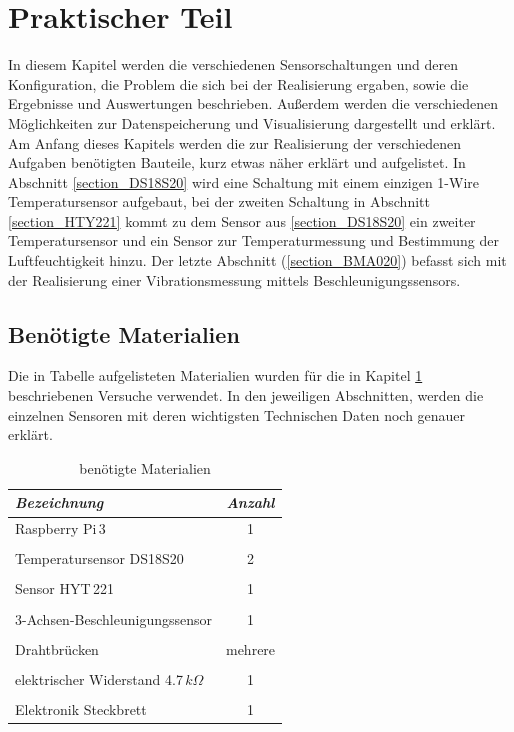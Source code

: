 \chapter{Praktischer Teil}
\label{chapter_Praktischer_Teil}
In diesem Kapitel werden die verschiedenen Sensorschaltungen und deren Konfiguration, die Problem
die sich bei der Realisierung ergaben, sowie die Ergebnisse und Auswertungen beschrieben. Außerdem werden die verschiedenen Möglichkeiten zur Datenspeicherung und Visualisierung dargestellt und erklärt. Am Anfang dieses Kapitels werden die zur Realisierung der verschiedenen Aufgaben benötigten Bauteile, kurz etwas näher erklärt und aufgelistet. In Abschnitt \ref{section_DS18S20} wird eine Schaltung mit einem einzigen 1-Wire Temperatursensor aufgebaut, bei der zweiten Schaltung in Abschnitt \ref{section_HTY221} kommt zu dem Sensor aus \ref{section_DS18S20} ein zweiter Temperatursensor und ein Sensor zur Temperaturmessung und Bestimmung der Luftfeuchtigkeit hinzu. Der letzte Abschnitt (\ref{section_BMA020}) befasst sich mit der Realisierung einer Vibrationsmessung mittels Beschleunigungssensors.

\section{Benötigte Materialien}
\label{section_Benötigte_Materialien}
Die in Tabelle aufgelisteten Materialien wurden für die in Kapitel \ref{chapter_Praktischer_Teil} beschriebenen Versuche verwendet. In den jeweiligen Abschnitten, werden die  einzelnen Sensoren mit deren wichtigsten Technischen Daten noch genauer erklärt. 

\begin{table}[H]
\centering
\begin{tabular}{
lc
}
\toprule
\multicolumn{1}{p{6cm}}{\textit{Bezeichnung}} & \multicolumn{1}{p{3.5cm}}{\centering\textit{Anzahl} } \\\midrule
Raspberry Pi\,3& 1 \\
&\\
Temperatursensor DS18S20 & 2 \\
&\\
Sensor HYT\,221 & 1\\
&\\
3-Achsen-Beschleunigungssensor & 1\\
&\\
Drahtbrücken & mehrere\\
&\\
elektrischer Widerstand 4.7\,$k\Omega$ & 1\\
&\\
Elektronik Steckbrett & 1\\
\bottomrule
\end{tabular}
\caption{benötigte Materialien}
\label{Tabelle_benötigte_Materialien}
\end{table}

